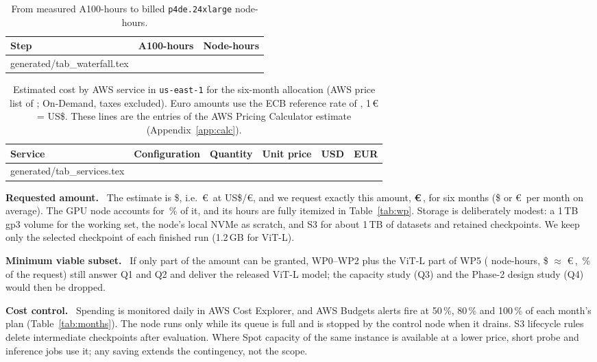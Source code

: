 \documentclass[11pt,a4paper]{article}
\makeatletter
\renewcommand{\EUR}[1]{\euro\,#1}
\newcommand{\para}[1]{\textbf{#1}\ }
\newcommand{\tabinput}[1]{\@@input #1 }%
\makeatother
\begin{document}
\begin{table}[H]
\centering\small
\caption{From measured A100-hours to billed \texttt{p4de.24xlarge} node-hours.}
\label{tab:waterfall}
\begin{tabular}{@{}lrr@{}}
\toprule
Step & A100-hours & Node-hours \\
\midrule
\tabinput{generated/tab_waterfall.tex}
\bottomrule
\end{tabular}
\end{table}

\begin{table}[H]
\centering\footnotesize
\caption{Estimated cost by AWS service in \texttt{us-east-1} for the six-month allocation (AWS price list of \PriceDate; On-Demand, taxes excluded). Euro amounts use the ECB reference rate of \FXdate{}, 1\,\euro{} = \FX{} US\$. These lines are the entries of the AWS Pricing Calculator estimate (Appendix~\ref{app:calc}).}
\label{tab:services}
\setlength{\tabcolsep}{4pt}
\begin{tabularx}{\textwidth}{@{}l>{\raggedright\arraybackslash}Xrrrr@{}}
\toprule
Service & Configuration & Quantity & Unit price & USD & EUR \\
\midrule
\tabinput{generated/tab_services.tex}
\bottomrule
\end{tabularx}
\end{table}

\para{Requested amount.} The estimate is \$\TotalUSD{}, i.e.\ \EUR{\TotalEUR} at \FX{} US\$/\euro{}, and we request exactly this amount, \textbf{\EUR{\RequestEUR}}, for six months (\$\MonthlyUSD{} or \EUR{\MonthlyEUR} per month on average). The GPU node accounts for \NodeSharePct\,\% of it, and its hours are fully itemized in Table~\ref{tab:wp}. Storage is deliberately modest: a 1\,TB gp3 volume for the working set, the node's local NVMe as scratch, and S3 for about 1\,TB of datasets and retained checkpoints. We keep only the selected checkpoint of each finished run (1.2\,GB for ViT-L).

\para{Minimum viable subset.} If only part of the amount can be granted, WP0--WP2 plus the ViT-L part of WP5 (\MVSNodeH{} node-hours, \$\MVSUSD{} $\approx$ \EUR{\MVSEUR}, \MVSPct\,\% of the request) still answer Q1 and Q2 and deliver the released ViT-L model; the capacity study (Q3) and the Phase-2 design study (Q4) would then be dropped.

\para{Cost control.} Spending is monitored daily in AWS Cost Explorer, and AWS Budgets alerts fire at 50\,\%, 80\,\% and 100\,\% of each month's plan (Table~\ref{tab:months}). The node runs only while its queue is full and is stopped by the control node when it drains. S3 lifecycle rules delete intermediate checkpoints after evaluation. Where Spot capacity of the same instance is available at a lower price, short probe and inference jobs use it; any saving extends the contingency, not the scope.
\end{document}
